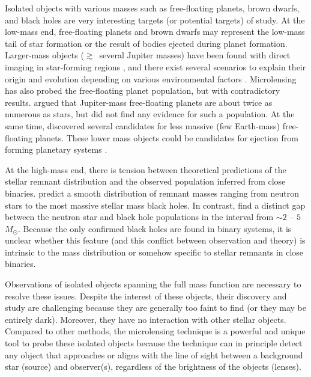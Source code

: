 \documentclass[10pt]{emulateapj}
\begin{document}
 Isolated objects with various masses such as free-floating planets, brown dwarfs, and black holes 
are very interesting targets (or potential targets) of study. At the low-mass end, free-floating 
planets and brown dwarfs may represent the low-mass tail of star formation or the result of bodies 
ejected during planet formation. Larger-mass objects ($\gtrsim\,$ several Jupiter masses) have been 
found with direct imaging in star-forming regions \citep[e.g.,][]{bihain09,esplin17}, and there exist 
several scenarios to explain their origin and evolution depending on various environmental factors 
\citep{whitworth07}. Microlensing has also probed the free-floating planet population, but with 
contradictory results. \citet{sumi11} argued that Jupiter-mass free-floating planets are about 
twice as numerous as stars, but \citet{mroz17} did not find any evidence for such a population. 
At the same time, \citet{mroz17,mroz18} discovered several candidates for less massive (few Earth-mass) 
free-floating planets. These lower mass objects could be candidates for ejection from forming 
planetary systems \citep[e.g.,][]{juric08, chatterjee08, barclay17}.
 
 At the high-mass end, there is tension between theoretical predictions of the stellar remnant 
distribution and the observed population inferred from close binaries. \citet{fryer12} predict 
a smooth distribution of remnant masses ranging from neutron stars to the most massive stellar 
mass black holes. In contrast, \citet{ozel12} find a distinct gap between the neutron star and 
black hole populations in the interval from $\sim 2$ -- $5$ $M_\odot$. Because the only confirmed 
black holes are found in binary systems, it is unclear whether this feature (and this conflict 
between observation and theory) is intrinsic to the mass distribution or somehow specific 
to stellar remnants in close binaries.

 Observations of isolated objects spanning the full mass function are necessary to resolve these 
issues. Despite the interest of these objects, their discovery and study are challenging because 
they are generally too faint to find (or they may be entirely dark). Moreover, they have no interaction 
with other stellar objects. Compared to other methods, the microlensing technique is a powerful 
and unique tool to probe these isolated objects because the technique can in principle detect 
any object that approaches or aligns with the line of sight between a background star (source) 
and observer(s), regardless of the brightness of the objects (lenses). 
\end{document}
